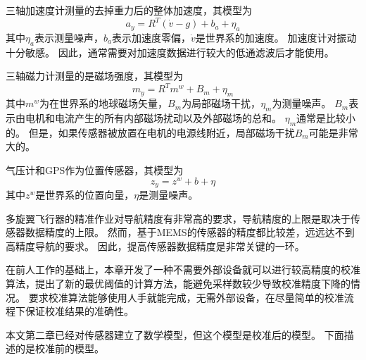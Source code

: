 \documentclass[
  type=master
]{gdutthesis}
\begin{document}
三轴加速度计测量的去掉重力后的整体加速度，其模型为
\begin{equation}\label{eq:accmodel}
	a_y=R^T(\dot{v}-g)+b_a+\eta_a
\end{equation}
其中$\eta_a$表示测量噪声，$b_a$表示加速度零偏，$\dot{v}$是世界系的加速度。
加速度计对振动十分敏感。
因此，通常需要对加速度数据进行较大的低通滤波后才能使用。

三轴磁力计测量的是磁场强度，其模型为
\begin{equation}\label{eq:magmodel}
	m_y=R^T m^w+B_m+\eta_m
\end{equation}
其中$m^w$为在世界系的地球磁场矢量，$B_m$为局部磁场干扰，$\eta_m$为测量噪声。
$B_m$表示由电机和电流产生的所有内部磁场扰动以及外部磁场的总和。
$\eta_m$通常是比较小的。
但是，如果传感器被放置在电机的电源线附近，局部磁场干扰$B_m$可能是非常大的。

气压计和GPS作为位置传感器，其模型为
\begin{equation}\label{eq:magmodel}
	z_y=z^w+b+\eta
\end{equation}
其中$z^w$是世界系的位置向量，$\eta$是测量噪声。

多旋翼飞行器的精准作业对导航精度有非常高的要求，导航精度的上限是取决于传感器数据精度的上限。
然而，基于MEMS的传感器的精度都比较差，远远达不到高精度导航的要求。
因此，提高传感器数据精度是非常关键的一环。

在前人工作的基础上，本章开发了一种不需要外部设备就可以进行较高精度的校准算法，提出了新的最优阈值的计算方法，能避免采样数较少导致校准精度下降的情况。
要求校准算法能够使用人手就能完成，无需外部设备，在尽量简单的校准流程下保证校准结果的准确性。


本文第二章已经对传感器建立了数学模型，但这个模型是校准后的模型。
下面描述的是校准前的模型。
\end{document}
